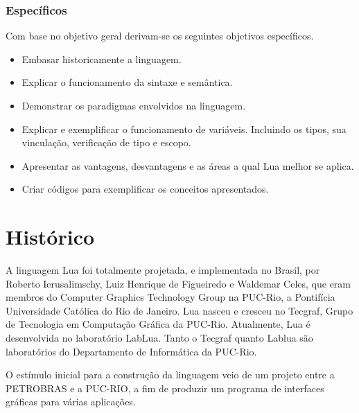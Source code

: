 \documentclass[
12pt, %
openright, %
oneside, %
a4paper, %
english, %
brazil, %
]{abntex2}
\begin{document}
\subsection{Específicos}
Com base no objetivo geral derivam-se os seguintes objetivos específicos.
\begin{itemize}
\item Embasar historicamente a linguagem.
\item Explicar o funcionamento da sintaxe e semântica.
\item Demonstrar os paradigmas envolvidos na linguagem.
\item Explicar e exemplificar o funcionamento de variáveis. Incluindo os tipos, sua vinculação, verificação de tipo e escopo.
\item Apresentar as vantagens, desvantagens e as áreas a qual Lua melhor se aplica.
\item Criar códigos para exemplificar os conceitos apresentados.
\end{itemize}






\chapter{Histórico}
A linguagem Lua foi totalmente projetada, e implementada no Brasil, por Roberto Ierusalimschy, Luiz Henrique de Figueiredo e Waldemar Celes, que eram membros do Computer Graphics Technology Group na PUC-Rio, a Pontifícia Universidade Católica do Rio de Janeiro. Lua nasceu e cresceu no Tecgraf, Grupo de Tecnologia em Computação Gráfica da PUC-Rio. Atualmente, Lua é desenvolvida no laboratório LabLua. Tanto o Tecgraf quanto Lablua são laboratórios do Departamento de Informática da PUC-Rio.

O estímulo inicial para a construção da linguagem veio de um projeto entre a PETROBRAS e a PUC-RIO, a fim de produzir um programa de interfaces gráficas para várias aplicações.
\end{document}

